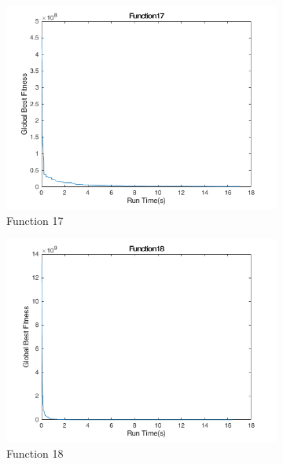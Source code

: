 \begin{figure}
  \centering
  \begin{subfigure}[b]{0.4\textwidth}
    \includegraphics[width=\textwidth]{img/cecrt/f17}
    \caption{Function 17}
  \end{subfigure}
  \begin{subfigure}[b]{0.4\textwidth}
    \includegraphics[width=\textwidth]{img/cecrt/f18}
    \caption{Function 18}
  \end{subfigure}
  \begin{subfigure}[b]{0.4\textwidth}

\end{subfigure}
\end{figure}

